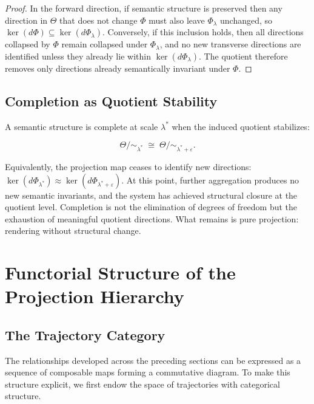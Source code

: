 \documentclass[11pt, twoside]{article}
\theoremstyle{plain}
\theoremstyle{definition}
\theoremstyle{remark}
\begin{document}
\begin{proof}
In the forward direction, if semantic structure is preserved then any direction in $\Theta$ that does not change $\Phi$ must also leave $\Phi_\lambda$ unchanged, so $\ker(d\Phi) \subseteq \ker(d\Phi_\lambda)$. Conversely, if this inclusion holds, then all directions collapsed by $\Phi$ remain collapsed under $\Phi_\lambda$, and no new transverse directions are identified unless they already lie within $\ker(d\Phi_\lambda)$. The quotient therefore removes only directions already semantically invariant under $\Phi$.
\end{proof}

\subsection{Completion as Quotient Stability}

A semantic structure is complete at scale $\lambda^*$ when the induced quotient stabilizes:

\[
\Theta / {\sim_{\lambda^*}} \;\cong\; \Theta / {\sim_{\lambda^* + \varepsilon}}.
\]

Equivalently, the projection map ceases to identify new directions: $\ker(d\Phi_{\lambda^*}) \approx \ker(d\Phi_{\lambda^* + \varepsilon})$. At this point, further aggregation produces no new semantic invariants, and the system has achieved structural closure at the quotient level. Completion is not the elimination of degrees of freedom but the exhaustion of meaningful quotient directions. What remains is pure projection: rendering without structural change.

\section{Functorial Structure of the Projection Hierarchy}
\label{sec:functorial}

\subsection{The Trajectory Category}

The relationships developed across the preceding sections can be expressed as a sequence of composable maps forming a commutative diagram. To make this structure explicit, we first endow the space of trajectories with categorical structure.
\end{document}
